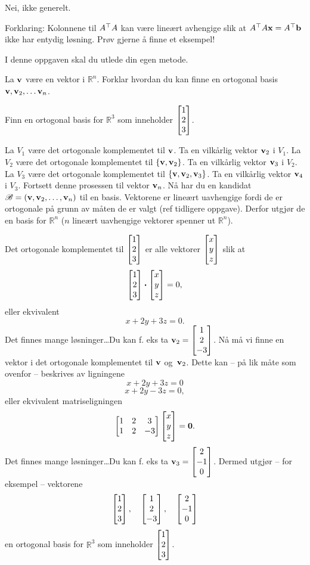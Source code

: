 \begin{losning}
Nei, ikke generelt.

\noindent
Forklaring: Kolonnene til $A^\top A$ kan være lineært avhengige slik at $A^\top A \mathbf{x}=A^\top \mathbf{b}$ ikke har entydig løsning. Prøv gjerne å finne et eksempel!
\end{losning}



\begin{oppgave} I denne oppgaven skal du utlede din egen metode.
\begin{punkt}
La $\mathbf{v}$ være en vektor i $\mathbb{R}^n$. Forklar hvordan du kan finne en ortogonal basis $\mathbf{v},\mathbf{v}_2,\dots \mathbf{v}_n$.
\end{punkt}
\begin{punkt}
Finn en ortogonal basis for $\mathbb{R}^3$ som inneholder $\begin{bmatrix} 1 \\ 2 \\ 3 \end{bmatrix}$.
\end{punkt}
\end{oppgave}

\begin{losning}
\begin{punkt}
La $V_1$ være det ortogonale komplementet til $\mathbf{v}$. Ta en vilkårlig vektor $\mathbf{v}_2$ i $V_1$. La $V_2$ være det ortogonale komplementet til $\{\mathbf{v},\mathbf{v}_2\}$. Ta en vilkårlig vektor $\mathbf{v}_3$ i $V_2$. La $V_3$ være det ortogonale komplementet til $\{\mathbf{v},\mathbf{v}_2,\mathbf{v}_3\}$. Ta en vilkårlig vektor $\mathbf{v}_4$ i $V_3$. Fortsett denne prosessen til vektor $\mathbf{v}_n$. Nå har du en kandidat $\mathscr{B}=(\mathbf{v},\mathbf{v}_2,\dots,\mathbf{v}_n)$ til en basis. Vektorene er lineært uavhengige fordi de er ortogonale på grunn av måten de er valgt (ref tidligere oppgave). Derfor utgjør de en basis for $\mathbb{R}^n$ ($n$ lineært uavhengige vektorer spenner ut $\mathbb{R}^n$).
\end{punkt}
\begin{punkt}
Det ortogonale komplementet til $\begin{bmatrix} 1 \\ 2 \\ 3 \end{bmatrix}$ er alle vektorer $\begin{bmatrix} x \\ y \\ z \end{bmatrix}$ slik at $$\begin{bmatrix} 1 \\ 2 \\ 3 \end{bmatrix}\boldsymbol{\cdot }\begin{bmatrix} x \\ y \\ z \end{bmatrix}=0,$$ eller ekvivalent
$$x+2y+3z=0.$$ Det finnes mange løsninger\ldots Du kan f. eks ta $\mathbf{v}_2=\begin{bmatrix} 1 \\ 2 \\ -3 \end{bmatrix}$. Nå må vi finne en vektor i det ortogonale komplementet til $\mathbf{v}$ og~$\mathbf{v}_2$. Dette kan -- på lik måte som ovenfor -- beskrives av ligningene
$$x+2y+3z=0$$
$$x+2y-3z=0,$$ eller ekvivalent matriseligningen $$\begin{bmatrix}
1 & 2 & 3 \\
1 & 2 & -3
\end{bmatrix}\begin{bmatrix} x \\ y \\ z \end{bmatrix}=\mathbf{0}.$$ Det finnes mange løsninger\ldots Du kan f. eks ta $\mathbf{v}_3=\begin{bmatrix} 2 \\ -1 \\ 0 \end{bmatrix}$. Dermed utgjør -- for eksempel -- vektorene 
$$\begin{bmatrix} 1 \\ 2 \\ 3 \end{bmatrix},\quad \begin{bmatrix} 1 \\ 2 \\ -3 \end{bmatrix},\quad \begin{bmatrix} 2 \\ -1 \\ 0 \end{bmatrix}$$ en ortogonal basis for $\mathbb{R}^3$ som inneholder $\begin{bmatrix} 1 \\ 2 \\ 3 \end{bmatrix}$.
\end{punkt}

\end{losning}


